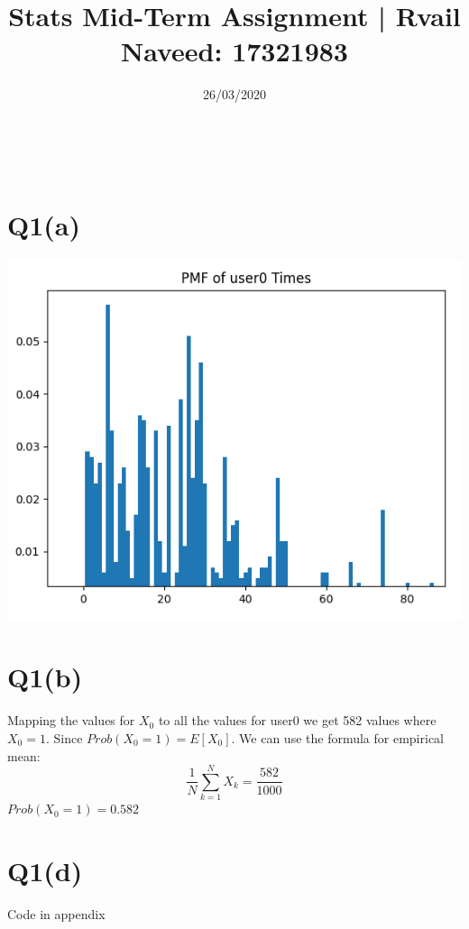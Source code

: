 \documentclass[a4paper,11pt]{article}
\makeatletter
\newcommand{\linia}{\rule{\linewidth}{0.5pt}}
\theoremstyle{mytheor}
\renewcommand{\maketitle}{
\begin{center}
\vspace{1ex}
{\small \textsc{\@title}}
\vspace{1ex}
\\
\end{center}
}
\makeatother
\begin{document}
\title{Stats Mid-Term Assignment | Rvail Naveed: 17321983}

\date{26/03/2020}

\maketitle

\begin{minipage}[t]{0.48\linewidth}
    \section*{Q1(a)}
        \includegraphics[scale=0.3]{pmf.png}
\end{minipage}
\hfill
\begin{minipage}[t]{0.48\linewidth}
    \section*{Q1(b)} 
        Mapping the values for $X_0$ to all the values for user0 we get
        582 values where $X_0=1$. Since $Prob(X_0 = 1) = E[X_0]$. We can use the formula for empirical mean:
        $$ \frac{1}{N}\sum_{k=1}^NX_k = \frac{582}{1000}$$
        $Prob(X_0 = 1) = 0.582$
    \newline
    \section*{Q1(d)} 
        Code in appendix
\end{minipage}
\end{document}
